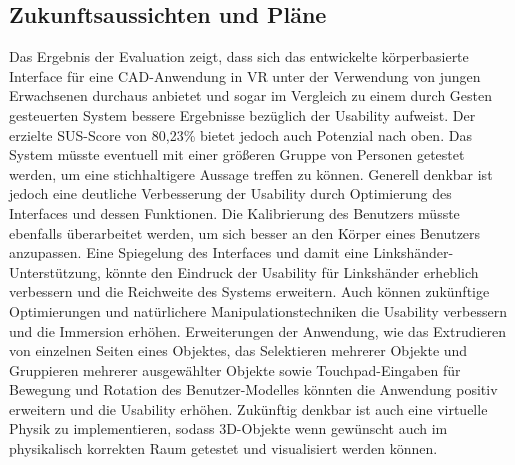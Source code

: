 \subsection{Zukunftsaussichten und Pläne}
Das Ergebnis der Evaluation zeigt, dass sich das entwickelte körperbasierte Interface für eine CAD-Anwendung in VR unter der Verwendung von jungen Erwachsenen durchaus anbietet und sogar im Vergleich zu einem durch Gesten gesteuerten System bessere Ergebnisse bezüglich der Usability aufweist. Der erzielte SUS-Score von 80,23\% bietet jedoch auch Potenzial nach oben. Das System müsste eventuell mit einer größeren Gruppe von Personen getestet werden, um eine stichhaltigere Aussage treffen zu können. Generell denkbar ist jedoch eine deutliche Verbesserung der Usability durch Optimierung des Interfaces und dessen Funktionen. Die Kalibrierung des Benutzers müsste ebenfalls überarbeitet werden, um sich besser an den Körper eines Benutzers anzupassen. Eine Spiegelung des Interfaces und damit eine Linkshänder-Unterstützung, könnte den Eindruck der Usability für Linkshänder erheblich verbessern und die Reichweite des Systems erweitern. Auch können zukünftige Optimierungen und natürlichere Manipulationstechniken die Usability verbessern und die Immersion erhöhen. Erweiterungen der Anwendung, wie das Extrudieren von einzelnen Seiten eines Objektes, das Selektieren mehrerer Objekte und Gruppieren mehrerer ausgewählter Objekte sowie Touchpad-Eingaben für Bewegung und Rotation des Benutzer-Modelles könnten die Anwendung positiv erweitern und die Usability erhöhen. Zukünftig denkbar ist auch eine virtuelle Physik zu implementieren, sodass 3D-Objekte wenn gewünscht auch im physikalisch korrekten Raum getestet und visualisiert werden können.
